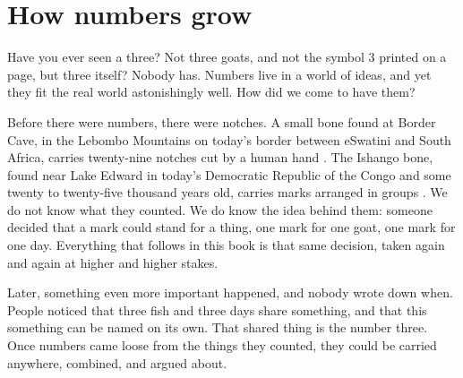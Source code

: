 \section{How numbers grow}\label{sec:numbers-grow}

Have you ever seen a three? Not three goats, and not the symbol 3 printed on a page, but three itself? Nobody has. Numbers live in a world of ideas, and yet they fit the real world astonishingly well. How did we come to have them?


Before there were numbers, there were notches. A small bone found at Border Cave, in the Lebombo Mountains on today's border between eSwatini and South Africa, carries twenty-nine notches cut by a human hand \citep{dErrico2012}. The Ishango bone, found near Lake Edward in today's Democratic Republic of the Congo and some twenty to twenty-five thousand years old, carries marks arranged in groups \citep{BrooksSmith1987}. We do not know what they counted. We do know the idea behind them: someone decided that a mark could stand for a thing, one mark for one goat, one mark for one day. Everything that follows in this book is that same decision, taken again and again at higher and higher stakes.

Later, something even more important happened, and nobody wrote down when. People noticed that three fish and three days share something, and that this something can be named on its own. That shared thing is the number three. Once numbers came loose from the things they counted, they could be carried anywhere, combined, and argued about.

